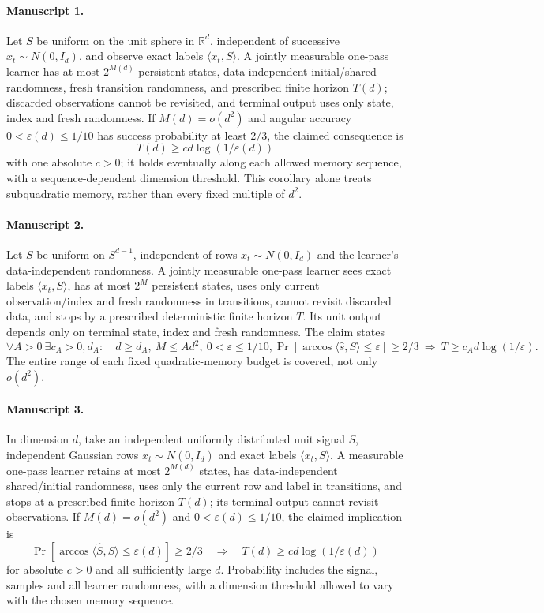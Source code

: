 \documentclass[11pt]{article}
\begin{document}
\paragraph{Manuscript 1.}
Let $S$ be uniform on the unit sphere in $\mathbb R^d$, independent of successive $x_t\sim N(0,I_d)$, and observe exact labels $\langle x_t,S\rangle$. A jointly measurable one-pass learner has at most $2^{M(d)}$ persistent states, data-independent initial/shared randomness, fresh transition randomness, and prescribed finite horizon $T(d)$; discarded observations cannot be revisited, and terminal output uses only state, index and fresh randomness. If $M(d)=o(d^2)$ and angular accuracy $0<\varepsilon(d)\le1/10$ has success probability at least $2/3$, the claimed consequence is
\[
 T(d)\ge c d\log(1/\varepsilon(d))
\]
with one absolute $c>0$; it holds eventually along each allowed memory sequence, with a sequence-dependent dimension threshold. This corollary alone treats subquadratic memory, rather than every fixed multiple of $d^2$.

\paragraph{Manuscript 2.}
Let $S$ be uniform on $S^{d-1}$, independent of rows $x_t\sim N(0,I_d)$ and the learner's data-independent randomness. A jointly measurable one-pass learner sees exact labels $\langle x_t,S\rangle$, has at most $2^M$ persistent states, uses only current observation/index and fresh randomness in transitions, cannot revisit discarded data, and stops by a prescribed deterministic finite horizon $T$. Its unit output depends only on terminal state, index and fresh randomness. The claim states
\[
 \forall A>0\ \exists c_A>0,d_A:\quad
 d\ge d_A,\ M\le Ad^2,\ 0<\varepsilon\le1/10,
 \Pr[\arccos\langle\widehat s,S\rangle\le\varepsilon]\ge2/3
 \ \Rightarrow\ T\ge c_A d\log(1/\varepsilon).
\]
The entire range of each fixed quadratic-memory budget is covered, not only $o(d^2)$.

\paragraph{Manuscript 3.}
In dimension $d$, take an independent uniformly distributed unit signal $S$, independent Gaussian rows $x_t\sim N(0,I_d)$ and exact labels $\langle x_t,S\rangle$. A measurable one-pass learner retains at most $2^{M(d)}$ states, has data-independent shared/initial randomness, uses only the current row and label in transitions, and stops at a prescribed finite horizon $T(d)$; its terminal output cannot revisit observations. If $M(d)=o(d^2)$ and $0<\varepsilon(d)\le1/10$, the claimed implication is
\[
 \Pr[\arccos\langle\widehat S,S\rangle\le\varepsilon(d)]\ge2/3
 \quad\Longrightarrow\quad T(d)\ge c d\log(1/\varepsilon(d))
\]
for absolute $c>0$ and all sufficiently large $d$. Probability includes the signal, samples and all learner randomness, with a dimension threshold allowed to vary with the chosen memory sequence.
\end{document}
